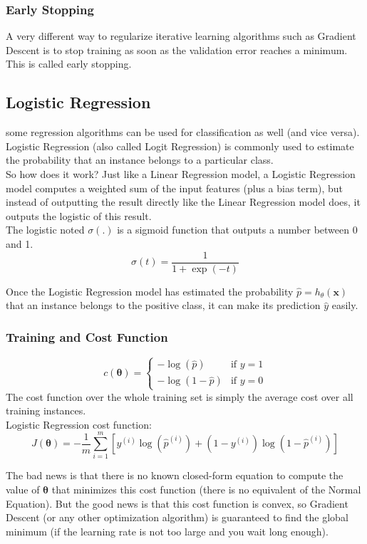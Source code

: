 \documentclass[french]{article}
\begin{document}
\subsubsection{Early Stopping}

A very different way to regularize iterative learning algorithms such as Gradient Descent is to stop training as soon as the validation error reaches a minimum. This is called early stopping.

\subsection{Logistic Regression}

some regression algorithms can be used for classification as well (and vice versa). Logistic Regression (also called Logit Regression) is commonly used to estimate the probability that an instance belongs to a particular class.\\

So how does it work? Just like a Linear Regression model, a Logistic Regression model computes a weighted sum of the input features (plus a bias term), but instead of outputting the result directly like the Linear Regression model does, it outputs the logistic of this result.\\

The logistic noted $\sigma(.)$ is a sigmoid function that outputs a number between 0 and 1.
\[\sigma(t) = \frac{1}{1+\exp{(-t)}}\]

Once the Logistic Regression model has estimated the probability $\hat p = h_{\theta}(\bm{x})$ that an instance belongs to the positive class, it can make its prediction $\hat y$ easily.

\subsubsection{Training and Cost Function}
\[
    c(\bm{\theta}) =
    \begin{cases}
        -\log{(\hat p)} & \text{if $y=1$}\\
        -\log{(1 - \hat p)} & \text{if $y=0$}
    \end{cases}
\]
The cost function over the whole training set is simply the average cost over all training instances.\\
Logistic Regression cost function:
\[J(\bm{\theta}) = -\frac{1}{m} \sum_{i=1}^m [y^{(i)}\log(\hat p^{(i)}) + (1-y^{(i)})\log(1- \hat p^{(i)})]\]

The bad news is that there is no known closed-form equation to compute the value of $\bm{\theta}$ that minimizes this cost function (there is no equivalent of the Normal Equation).  But the good news is that this cost function is convex, so Gradient Descent (or any other optimization algorithm) is guaranteed to find the global minimum (if the learning rate is not too large and you wait long enough).
\end{document}
